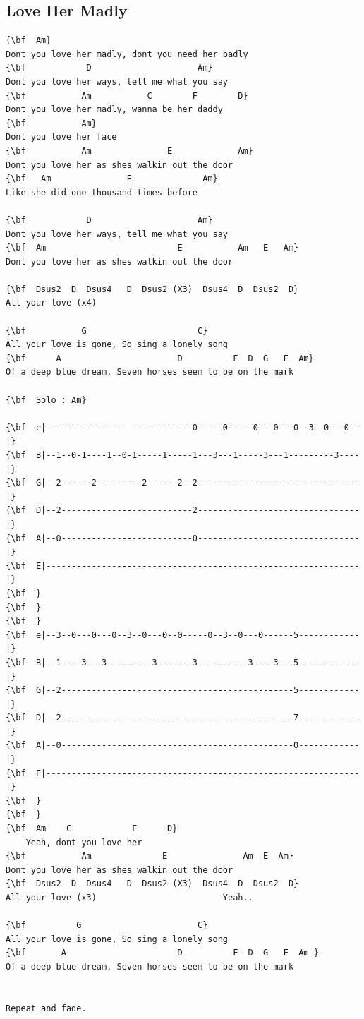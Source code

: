 \documentclass[a4paper]{article}
\begin{document}
\subsection{Love Her Madly}
\begin{Verbatim}[commandchars=\\\{\}]
{\bf  Am}
Dont you love her madly, dont you need her badly
{\bf            D                     Am}
Dont you love her ways, tell me what you say
{\bf           Am           C        F        D}
Dont you love her madly, wanna be her daddy
{\bf           Am}
Dont you love her face
{\bf           Am               E             Am}
Dont you love her as shes walkin out the door
{\bf   Am               E              Am}
Like she did one thousand times before

{\bf            D                     Am}
Dont you love her ways, tell me what you say
{\bf  Am                          E           Am   E   Am}
Dont you love her as shes walkin out the door

{\bf  Dsus2  D  Dsus4   D  Dsus2 (X3)  Dsus4  D  Dsus2  D}
All your love (x4)

{\bf           G                      C}
All your love is gone, So sing a lonely song
{\bf      A                       D          F  D  G   E  Am}
Of a deep blue dream, Seven horses seem to be on the mark

{\bf  Solo : Am}

{\bf  e|-----------------------------0-----0-----0---0---0--3--0---0--|}
{\bf  B|--1--0-1----1--0-1-----1-----1---3---1-----3---1---------3----|}
{\bf  G|--2------2---------2------2--2--------------------------------|}
{\bf  D|--2--------------------------2--------------------------------|}
{\bf  A|--0--------------------------0--------------------------------|}
{\bf  E|--------------------------------------------------------------|}
{\bf  }
{\bf  }
{\bf  }
{\bf  e|--3--0---0---0--3--0---0--0-----0--3--0---0------5------------|}
{\bf  B|--1----3---3---------3-------3----------3----3---5------------|}
{\bf  G|--2----------------------------------------------5------------|}
{\bf  D|--2----------------------------------------------7------------|}
{\bf  A|--0----------------------------------------------0------------|}
{\bf  E|--------------------------------------------------------------|}
{\bf  }
{\bf  }
{\bf  Am    C            F      D}
    Yeah, dont you love her
{\bf           Am              E               Am  E  Am}
Dont you love her as shes walkin out the door
{\bf  Dsus2  D  Dsus4   D  Dsus2 (X3)  Dsus4  D  Dsus2  D}
All your love (x3)                         Yeah..                      

{\bf          G                       C}
All your love is gone, So sing a lonely song
{\bf       A                      D          F  D  G   E  Am }
Of a deep blue dream, Seven horses seem to be on the mark


Repeat and fade. 

\end{Verbatim}
\newpage
\end{document}
